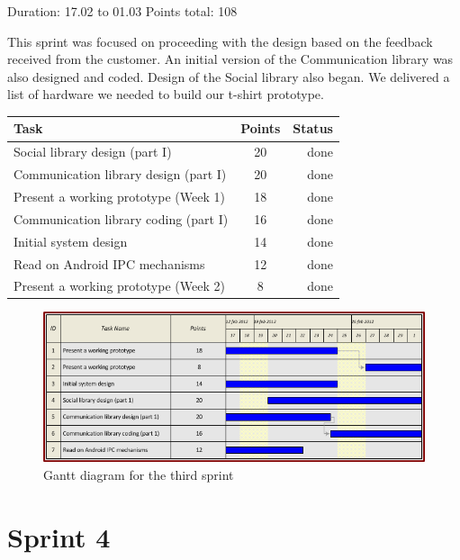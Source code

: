 Duration: 17.02 to 01.03
Points total: 108

This sprint was focused on proceeding with the design based on the
feedback received from the customer. An initial version of the Communication
library was also designed and coded. Design of the Social library also began.
We delivered a list of hardware we needed to build our t-shirt prototype.

\begin{table}[ht!]
\begin{tabular}{ | l | c | r | }

\hline
\textbf{Task} & \textbf{Points} & \textbf{Status} \\
\hline

Social library design (part I)          & 20 & done \\
\hline
Communication library design (part I)       & 20 & done \\
\hline
Present a working prototype (Week 1)		& 18 & done \\
\hline
Communication library coding (part I)       & 16 & done \\
\hline
Initial system design               & 14 & done \\
\hline
Read on Android IPC mechanisms			& 12 & done \\
\hline
Present a working prototype (Week 2)        & 8  & done \\
\hline

\end{tabular}
\end{table}

\begin{figure}[h!]
\centering \includegraphics[scale=0.8]{img/sprints-gantt3.png}
\caption{Gantt diagram for the third sprint}
\label{fig:sprints-gantt3}
\end{figure}

\newpage


\section{Sprint 4}

